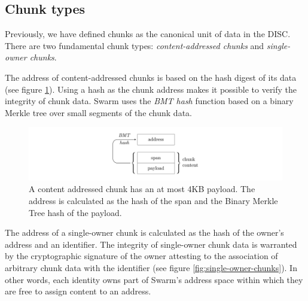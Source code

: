 \documentclass[12pt,a4paper]{article}
\begin{document}
\subsection{Chunk types}

Previously, we have defined chunks as the canonical unit of data in the DISC. There are two fundamental chunk types: \emph{content-addressed chunks} and \emph{single-owner chunks}. 

The address of content-addressed chunks is based on the hash digest of its data (see figure \ref{fig:content-addressed-chunk}). Using a hash as the chunk address makes it possible to verify the integrity of chunk data. Swarm uses the \emph{BMT hash} function based on a binary Merkle tree over small segments of the chunk data. 

\begin{figure}[!ht]
   \centering
   \includegraphics[width=\textwidth]{fig2/content-addressed-chunk-3.pdf}
   \caption[Content addressed chunk]{A content addressed chunk has an at most 4KB payload. The address is calculated as the hash of the span and the Binary Merkle Tree hash of the payload.}
   \label{fig:content-addressed-chunk}
\end{figure}



The address of a single-owner chunk is calculated as the hash of the owner’s address and an identifier. The integrity of single-owner chunk data is warranted by the cryptographic signature of the owner attesting to the association of arbitrary chunk data with the identifier  (see figure \ref{fig:single-owner-chunks}). In other words, each identity owns part of Swarm's address space within which they are free to assign content to an address.
\end{document}
